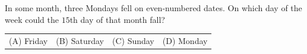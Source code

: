 In some month, three Mondays fell on even-numbered dates. On which day of the week could the $15$th day of that month fall?



\begin{tabular}{llll}
(A) Friday & (B) Saturday & (C) Sunday & (D) Monday
\end{tabular}
